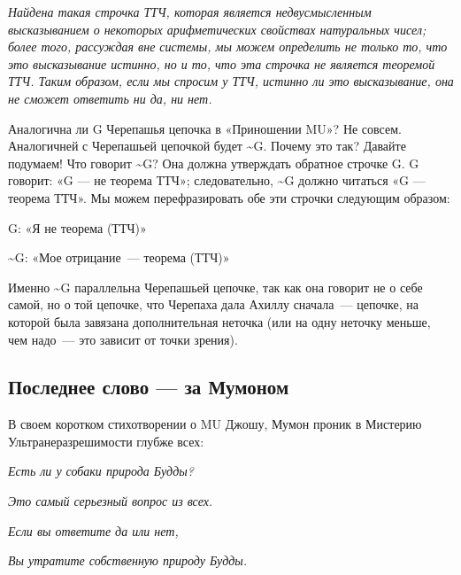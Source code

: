 \documentclass[../main.tex]{subfiles}
\begin{document}
\emph{Найдена такая строчка ТТЧ, которая является недвусмысленным высказыванием о некоторых арифметических свойствах натуральных чисел; более того, рассуждая вне системы, мы можем определить не только то, что это высказывание истинно, но и то, что эта строчка не является теоремой ТТЧ. Таким образом, если мы спросим у ТТЧ, истинно ли это высказывание, она не сможет ответить ни да, ни нет.}

Аналогична ли G Черепашья цепочка в «Приношении MU»? Не совсем. Аналогичней с Черепашьей цепочкой будет \textasciitilde G. Почему это так? Давайте подумаем! Что говорит \textasciitilde G? Она должна утверждать обратное строчке G. G говорит: «G --- не теорема ТТЧ»; следовательно, \textasciitilde G должно читаться «G --- теорема ТТЧ». Мы можем перефразировать обе эти строчки следующим образом:

G: «Я не теорема (ТТЧ)»

\textasciitilde G: «Мое отрицание~--- теорема (ТТЧ)»

Именно \textasciitilde G параллельна Черепашьей цепочке, так как она говорит не о себе самой, но о той цепочке, что Черепаха дала Ахиллу сначала~--- цепочке, на которой была завязана дополнительная неточка (или на одну неточку меньше, чем надо~--- это зависит от точки зрения).


\subsection{Последнее слово --- за Мумоном}

В своем коротком стихотворении о MU Джошу, Мумон проник в Мистерию Ультранеразрешимости глубже всех:

\emph{Есть ли у собаки природа Будды?}

\emph{Это самый серьезный вопрос из всех.}

\emph{Если вы ответите да или нет,}

\emph{Вы утратите собственную природу Будды.}
\end{document}
